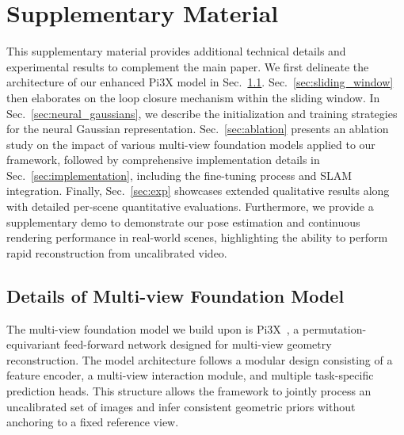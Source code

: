 \section{Supplementary Material}

This supplementary material provides additional technical details and experimental results to complement the main paper. We first delineate the architecture of our enhanced Pi3X model in Sec.~\ref{sec:model_arch}. Sec.~\ref{sec:sliding_window} then elaborates on the loop closure mechanism within the sliding window. In Sec.~\ref{sec:neural_gaussians}, we describe the initialization and training strategies for the neural Gaussian representation. Sec.~\ref{sec:ablation} presents an ablation study on the impact of various multi-view foundation models applied to our framework, followed by comprehensive implementation details in Sec.~\ref{sec:implementation}, including the fine-tuning process and SLAM integration. Finally, Sec.~\ref{sec:exp} showcases extended qualitative results along with detailed per-scene quantitative evaluations. Furthermore, we provide a supplementary demo to demonstrate our pose estimation and continuous rendering performance in real-world scenes, highlighting the ability to perform rapid reconstruction from uncalibrated video.

\subsection{Details of Multi-view Foundation Model}
\label{sec:model_arch}

The multi-view foundation model we build upon is Pi3X~\cite{wang2025pi}, a permutation-equivariant feed-forward network designed for multi-view geometry reconstruction. The model architecture follows a modular design consisting of a feature encoder, a multi-view interaction module, and multiple task-specific prediction heads. This structure allows the framework to jointly process an uncalibrated set of images and infer consistent geometric priors without anchoring to a fixed reference view.

